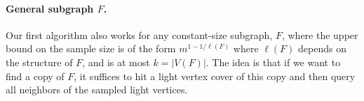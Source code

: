  \paragraph{General subgraph $F$.}
 Our first algorithm also works for any constant-size subgraph, $F$, where the upper bound on the sample size is of the form $m^{1-1/\ell(F)}$ where $\ell(F)$ depends on the structure of $F$, and is at most $k=|V(F)|$.
 The idea is that if we want to find a copy of $F$, it suffices to hit a light vertex cover of this copy and then query all neighbors of the sampled light vertices. 


